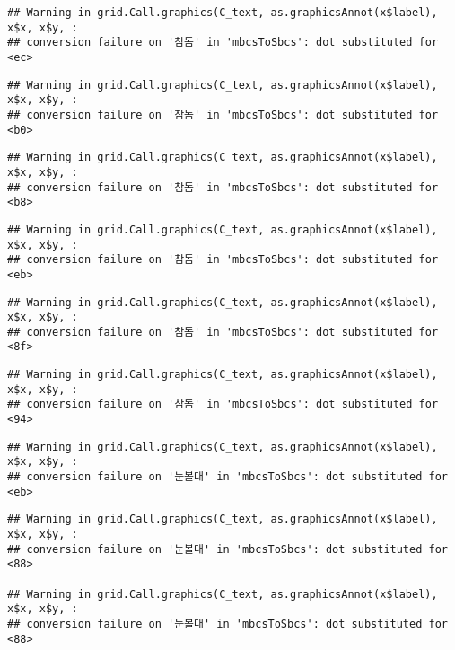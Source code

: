 \documentclass[
]{article}
\begin{document}
\begin{verbatim}
## Warning in grid.Call.graphics(C_text, as.graphicsAnnot(x$label), x$x, x$y, :
## conversion failure on '참돔' in 'mbcsToSbcs': dot substituted for <ec>
\end{verbatim}

\begin{verbatim}
## Warning in grid.Call.graphics(C_text, as.graphicsAnnot(x$label), x$x, x$y, :
## conversion failure on '참돔' in 'mbcsToSbcs': dot substituted for <b0>
\end{verbatim}

\begin{verbatim}
## Warning in grid.Call.graphics(C_text, as.graphicsAnnot(x$label), x$x, x$y, :
## conversion failure on '참돔' in 'mbcsToSbcs': dot substituted for <b8>
\end{verbatim}

\begin{verbatim}
## Warning in grid.Call.graphics(C_text, as.graphicsAnnot(x$label), x$x, x$y, :
## conversion failure on '참돔' in 'mbcsToSbcs': dot substituted for <eb>
\end{verbatim}

\begin{verbatim}
## Warning in grid.Call.graphics(C_text, as.graphicsAnnot(x$label), x$x, x$y, :
## conversion failure on '참돔' in 'mbcsToSbcs': dot substituted for <8f>
\end{verbatim}

\begin{verbatim}
## Warning in grid.Call.graphics(C_text, as.graphicsAnnot(x$label), x$x, x$y, :
## conversion failure on '참돔' in 'mbcsToSbcs': dot substituted for <94>
\end{verbatim}

\begin{verbatim}
## Warning in grid.Call.graphics(C_text, as.graphicsAnnot(x$label), x$x, x$y, :
## conversion failure on '눈볼대' in 'mbcsToSbcs': dot substituted for <eb>
\end{verbatim}

\begin{verbatim}
## Warning in grid.Call.graphics(C_text, as.graphicsAnnot(x$label), x$x, x$y, :
## conversion failure on '눈볼대' in 'mbcsToSbcs': dot substituted for <88>

## Warning in grid.Call.graphics(C_text, as.graphicsAnnot(x$label), x$x, x$y, :
## conversion failure on '눈볼대' in 'mbcsToSbcs': dot substituted for <88>
\end{verbatim}
\end{document}
